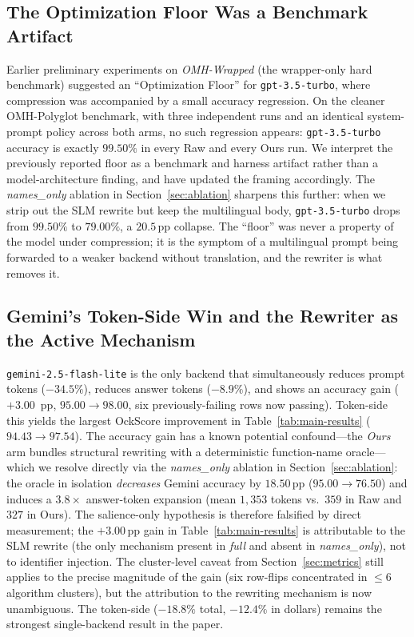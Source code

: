 \documentclass[11pt,a4paper,twocolumn]{article}
\begin{document}
\subsection{The Optimization Floor Was a Benchmark Artifact}
\label{sec:floor}
Earlier preliminary experiments on \textit{OMH-Wrapped} (the wrapper-only hard benchmark) suggested an ``Optimization Floor'' for \texttt{gpt-3.5-turbo}, where compression was accompanied by a small accuracy regression. On the cleaner OMH-Polyglot benchmark, with three independent runs and an identical system-prompt policy across both arms, no such regression appears: \texttt{gpt-3.5-turbo} accuracy is exactly $99.50\%$ in every Raw and every Ours run. We interpret the previously reported floor as a benchmark and harness artifact rather than a model-architecture finding, and have updated the framing accordingly. The \textit{names\_only} ablation in Section~\ref{sec:ablation} sharpens this further: when we strip out the SLM rewrite but keep the multilingual body, \texttt{gpt-3.5-turbo} drops from $99.50\%$ to $79.00\%$, a $20.5$\,pp collapse. The ``floor'' was never a property of the model under compression; it is the symptom of a multilingual prompt being forwarded to a weaker backend without translation, and the rewriter is what removes it.

\subsection{Gemini's Token-Side Win and the Rewriter as the Active Mechanism}
\label{sec:gemini}
\texttt{gemini-2.5-flash-lite} is the only backend that simultaneously reduces prompt tokens ($-34.5\%$), reduces answer tokens ($-8.9\%$), and shows an accuracy gain ($+3.00$~pp, $95.00 \rightarrow 98.00$, six previously-failing rows now passing). Token-side this yields the largest OckScore improvement in Table~\ref{tab:main-results} ($94.43 \rightarrow 97.54$). The accuracy gain has a known potential confound---the \textit{Ours} arm bundles structural rewriting with a deterministic function-name oracle---which we resolve directly via the \textit{names\_only} ablation in Section~\ref{sec:ablation}: the oracle in isolation \emph{decreases} Gemini accuracy by $18.50$\,pp ($95.00 \rightarrow 76.50$) and induces a $3.8\times$ answer-token expansion (mean $1{,}353$ tokens vs.\ $359$ in Raw and $327$ in Ours). The salience-only hypothesis is therefore falsified by direct measurement; the $+3.00$\,pp gain in Table~\ref{tab:main-results} is attributable to the SLM rewrite (the only mechanism present in \textit{full} and absent in \textit{names\_only}), not to identifier injection. The cluster-level caveat from Section~\ref{sec:metrics} still applies to the precise magnitude of the gain (six row-flips concentrated in $\le 6$ algorithm clusters), but the attribution to the rewriting mechanism is now unambiguous. The token-side ($-18.8\%$ total, $-12.4\%$ in dollars) remains the strongest single-backend result in the paper.
\end{document}
